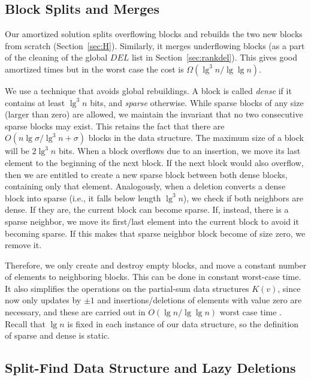 \documentclass[11pt]{article}
\newcommand{\cP}{{ K}}
\begin{document}
\subsection{Block Splits and Merges} \label{sec:indels}

Our amortized solution splits overflowing blocks and rebuilds the two new
blocks from scratch (Section~\ref{sec:H}). Similarly, it merges underflowing 
blocks (as a part of the cleaning of the global $DEL$ list in 
Section~\ref{sec:rankdel}). This gives good amortized times but in the worst
case the cost is $\Omega(\lg^3 n/\lg\lg n)$.

We use a technique \cite{GN09} that avoids global rebuildings. A block
is called {\em dense} if it contains at least $\lg^3 n$ bits, and {\em
sparse} otherwise. While sparse blocks of any size (larger than zero) are 
allowed, we maintain the invariant that no two consecutive sparse blocks may 
exist. This retains the fact that there are $O(n\lg\sigma/\lg^3 n + \sigma)$ 
blocks in the data structure. The maximum size of a block will be $2\lg^3 n$
bits.
When a block overflows due to an insertion, we move its last element to the
beginning of the next block. If the next block would also overflow,
then we are entitled to create a new sparse block between both dense blocks, 
containing only that element. Analogously, when a deletion converts a dense
block into sparse (i.e., it falls below length $\lg^3 n$), we check if both
neighbors are dense. If they are, the current block can become sparse. If,
instead, there is a sparse neighbor, we move its first/last element
into the current block to avoid it becoming sparse. If this makes that sparse
neighbor block become of size zero, we remove it.

Therefore, we only create and destroy empty blocks, and move a constant 
number of elements to neighboring blocks. This can be done in constant
worst-case time. It also simplifies the operations on the partial-sum
data structures $\cP(v)$, since now only updates by $\pm 1$ and insertions/deletions
of elements with value zero are necessary, and these are carried out in
$O(\lg n / \lg\lg n)$ worst case time \cite[Lem.~1]{NS10}.
Recall that $\lg n$ is fixed in each instance of our data
structure, so the definition of sparse and dense is static.

\subsection{Split-Find Data Structure and Lazy Deletions}
\end{document}
